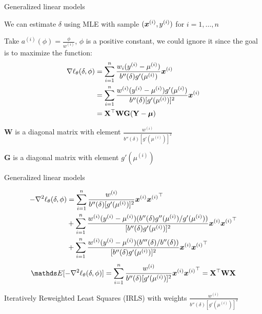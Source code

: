 \documentclass[11pt,compress,t,notes=noshow, xcolor=table]{beamer}
\begin{document}
\begin{framei}[fs=small]{Generalized linear models}
\item We can estimate $\delta$ using MLE with sample $(\bm{x}^{(i)},y^{(i)})$ for $i=1,\ldots,n$
\item Take $a^{(i)}(\phi) = \frac{\phi}{w^{(i)}}$, $\phi$ is a positive constant, we could ignore it since the goal is to maximize the function:
\begin{align*}
\nabla \ell_{\theta}(\delta, \phi) &= \sum\limits_{i=1}^n \frac{w_i(y^{(i)}-\mu^{(i)})}{b''(\delta)g'(\mu^{(i)})}\bm{x}^{(i)}\\
&= \sum\limits_{i=1}^n \frac{w^{(i)}(y^{(i)}-\mu^{(i)})g'(\mu^{(i)})}{b''(\delta)[g'(\mu^{(i)})]^2}\bm{x}^{(i)}\\
&= \mathbf{X}^\top \mathbf{W} \mathbf{G} (\mathbf{Y}-\bm{\mu})
\end{align*}
\item $\mathbf{W}$ is a diagonal matrix with element $\frac{w^{(i)}}{b''(\delta)[g'(\mu^{(i)})]^2}$
\item $\mathbf{G}$ is a diagonal matrix with element $g'(\mu^{(i)})$
\end{framei}


\begin{framei}[fs=small]{Generalized linear models}
\item[]
\begin{align*}
-\nabla^2 \ell_{\theta}(\delta, \phi)
& = \sum\limits_{i=1}^n \frac{w^{(i)}}{b''(\delta)[g'(\mu^{(i)})]^2}\bm{x}^{(i)}{\bm{x}^{(i)}}^\top \\
& + \sum\limits_{i=1}^n \frac{w^{(i)}(y^{(i)}-\mu^{(i)})(b''(\delta)g''(\mu^{(i)})/g'(\mu^{(i)}))}{[b''(\delta)g'(\mu^{(i)})]^2}\bm{x}^{(i)}{\bm{x}^{(i)}}^\top \\
& + \sum\limits_{i=1}^n \frac{w^{(i)}(y^{(i)}-\mu^{(i)})(b'''(\delta)/b''(\delta))}{[b''(\delta)g'(\mu^{(i)})]^2}\bm{x}^{(i)}{\bm{x}^{(i)}}^\top
\end{align*}
$$\E[-\nabla^2 \logl_{\theta}(\delta, \phi)] = \sumin \frac{w^{(i)}}{b''(\delta)[g'(\mu^{(i)})]^2}\xv^{(i)}{\xv^{(i)}}^\top = \Xmat^\top \mathbf{W} \Xmat$$
\item Iteratively Reweighted Least Squares (IRLS) with weights $\frac{w^{(i)}}{b''(\delta)[g'(\mu^{(i)})]^2}$
\end{framei}
\end{document}

